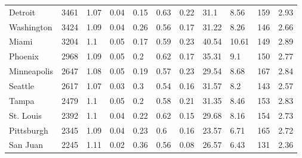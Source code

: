 \documentclass{article}
\begin{document}
\begin{landscape}
\begin{table}
\begin{tabular}{p{2.5cm} p{1.5cm} p{1.5cm} p{1.5cm} p{1.55cm} p{1.5cm} p{1.5cm} p{1.5cm} p{1.5cm} p{1.5cm} p{1.5cm}}
Detroit              & 3461          & 1.07         & 0.04                       & 0.15           & 0.63        & 0.22        & 31.1                  & 8.56                  & 159                   & 2.93             \\
Washington           & 3424          & 1.09         & 0.04                       & 0.26           & 0.56        & 0.17        & 31.22                 & 8.26                  & 146                   & 2.66             \\
Miami                & 3204          & 1.1          & 0.05                       & 0.17           & 0.59        & 0.23        & 40.54                 & 10.61                 & 149                   & 2.89             \\
Phoenix              & 2968          & 1.09         & 0.05                       & 0.2            & 0.62        & 0.17        & 35.31                 & 9.1                   & 150                   & 2.77             \\
Minneapolis          & 2647          & 1.08         & 0.05                       & 0.19           & 0.57        & 0.23        & 29.54                 & 8.68                  & 167                   & 2.84             \\
Seattle              & 2617          & 1.07         & 0.03                       & 0.3            & 0.54        & 0.16        & 31.57                 & 8.2                   & 143                   & 2.57             \\
Tampa                & 2479          & 1.1          & 0.05                       & 0.2            & 0.58        & 0.21        & 31.35                 & 8.46                  & 153                   & 2.83             \\
St. Louis            & 2392          & 1.1          & 0.04                       & 0.22           & 0.62        & 0.15        & 29.68                 & 8.16                  & 154                   & 2.73             \\
Pittsburgh           & 2345          & 1.09         & 0.04                       & 0.23           & 0.6         & 0.16        & 23.57                 & 6.71                  & 165                   & 2.72             \\
San Juan             & 2245          & 1.11         & 0.02                       & 0.36           & 0.56        & 0.08        & 26.57                 & 6.43                  & 131                   & 2.36             \\

\end{tabular}
\end{table}
\end{landscape}
\end{document}
